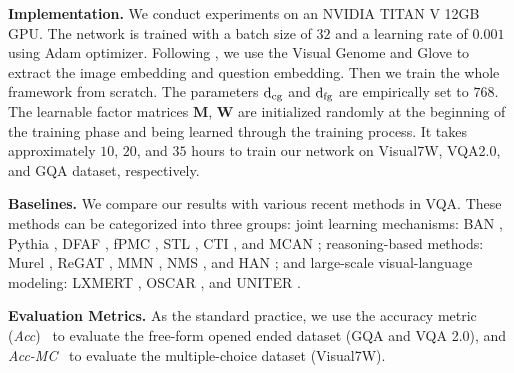 \documentclass[10pt,twocolumn,letterpaper]{article}
\begin{document}
\textbf{Implementation.}
\label{subsec:implement}
We conduct experiments on an NVIDIA TITAN V 12GB GPU. The network is trained with a batch size of $32$ and a learning rate of $0.001$ using Adam optimizer. Following \cite{Kim2018BilinearAN, kim2020hypergraph,tip-trick,Yang2016StackedAN}, we use the Visual Genome \cite{visualgenome} and Glove \cite{pennington2014glove} to extract the image embedding and question embedding. Then we train the whole framework from scratch. The parameters $\rm d_{cg}$ and $\rm d_{fg}$ are empirically set to $768$. The learnable factor matrices $\mathbf{M}$, $\mathbf{W}$ are initialized randomly at the beginning of the training phase and being learned through the training process. It takes approximately $10$, $20$, and $35$ hours to train our network on Visual7W, VQA2.0, and GQA dataset, respectively. 

\textbf{Baselines.} We compare our results with various recent methods in VQA. These methods can be categorized into three groups: joint learning mechanisms: BAN \cite{Kim2018BilinearAN}, Pythia \cite{Jiang2018PythiaVT}, DFAF \cite{gao2019DFAF}, fPMC \cite{hu2018learningfPMC}, STL \cite{wang2018structuredSTL}, CTI \cite{do2019cti}, and MCAN \cite{yu2019mcan}; reasoning-based methods: Murel \cite{cadene2019murel}, ReGAT \cite{li2019regat}, MMN \cite{chen2021meta}, NMS \cite{Hudson2019LearningBA}, and HAN \cite{kim2020hypergraph}; and large-scale visual-language modeling: LXMERT \cite{tan2019lxmert}, OSCAR \cite{li2020oscar}, and UNITER \cite{chen2020uniter}. 

\textbf{Evaluation Metrics.} 
As the standard practice, we use the accuracy metric (\textit{Acc})~\cite{VQA} to evaluate the free-form opened ended dataset (GQA and VQA 2.0), and  \textit{Acc-MC}~\cite{zhu2016visual7w} to evaluate the multiple-choice dataset (Visual7W).
\end{document}
